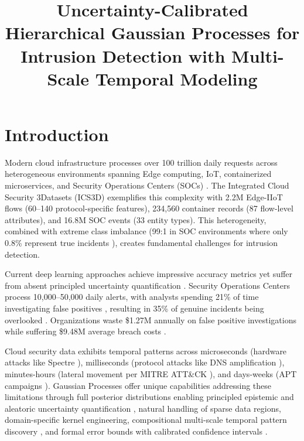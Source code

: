 \documentclass[review,12pt]{elsarticle}
\begin{document}
\begin{frontmatter}

\title{Uncertainty-Calibrated Hierarchical Gaussian Processes for Intrusion Detection with Multi-Scale Temporal Modeling}

\end{frontmatter}

\section{Introduction}

Modern cloud infrastructure processes over 100 trillion daily requests across heterogeneous environments spanning Edge computing, IoT, containerized microservices, and Security Operations Centers (SOCs) \cite{reinsel2018digitization}. The Integrated Cloud Security 3Datasets (ICS3D) \cite{RNA2025datasets} exemplifies this complexity with 2.2M Edge-IIoT flows (60–140 protocol-specific features), 234{,}560 container records (87 flow-level attributes), and 16.8M SOC events (33 entity types). This heterogeneity, combined with extreme class imbalance (99:1 in SOC environments where only 0.8\% represent true incidents \cite{freitas2024guide}), creates fundamental challenges for intrusion detection.

Current deep learning approaches achieve impressive accuracy metrics yet suffer from absent principled uncertainty quantification \cite{gal2016dropout}. Security Operations Centers process 10,000–50,000 daily alerts, with analysts spending 21\% of time investigating false positives \cite{ponemon2024soc}, resulting in 35\% of genuine incidents being overlooked \cite{mandiant2024mtrends}. Organizations waste \$1.27M annually on false positive investigations while suffering \$9.48M average breach costs \cite{ibm2024databreach}.

Cloud security data exhibits temporal patterns across microseconds (hardware attacks like Spectre \cite{kocher2019spectre}), milliseconds (protocol attacks like DNS amplification \cite{rossow2014amplification}), minutes-hours (lateral movement per MITRE ATT\&CK \cite{strom2018mitre}), and days-weeks (APT campaigns \cite{quintero2024apt}). Gaussian Processes offer unique capabilities addressing these limitations through full posterior distributions enabling principled epistemic and aleatoric uncertainty quantification \cite{rasmussen2006gaussian}, natural handling of sparse data regions, domain-specific kernel engineering, compositional multi-scale temporal pattern discovery \cite{wilson2013gaussian}, and formal error bounds with calibrated confidence intervals \cite{srinivas2010gaussian}.
\end{document}

